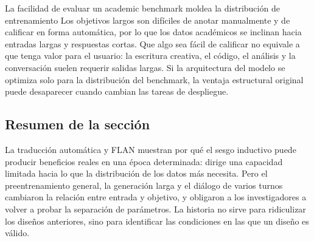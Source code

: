 \begin{warningbox}{La facilidad de evaluar un academic benchmark moldea la distribución de entrenamiento}
Los objetivos largos son difíciles de anotar manualmente y de calificar en forma automática, por lo que los datos académicos se inclinan hacia entradas largas y respuestas cortas. Que algo sea fácil de calificar no equivale a que tenga valor para el usuario: la escritura creativa, el código, el análisis y la conversación suelen requerir salidas largas. Si la arquitectura del modelo se optimiza solo para la distribución del benchmark, la ventaja estructural original puede desaparecer cuando cambian las tareas de despliegue.
\end{warningbox}

\subsection{Resumen de la sección}

La traducción automática y FLAN muestran por qué el sesgo inductivo puede producir beneficios reales en una época determinada: dirige una capacidad limitada hacia lo que la distribución de los datos más necesita. Pero el preentrenamiento general, la generación larga y el diálogo de varios turnos cambiaron la relación entre entrada y objetivo, y obligaron a los investigadores a volver a probar la separación de parámetros. La historia no sirve para ridiculizar los diseños anteriores, sino para identificar las condiciones en las que un diseño es válido.
